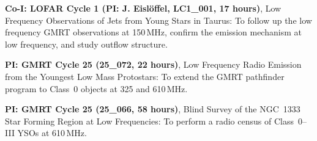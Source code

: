 \begin{cvpubs}
{\begin{cvlist}
  \item {\textbf{Co-I: LOFAR Cycle 1 (PI: J. Eisl{\"o}ffel, LC1\_001, 17 hours)}, Low Frequency Observations of Jets from Young Stars in Taurus: To follow up the low frequency GMRT observations at 150\,MHz, confirm the emission mechanism at low frequency, and study outflow structure.}
  \item {\textbf{PI: GMRT Cycle 25 (25\_072, 22 hours)}, Low Frequency Radio Emission from the Youngest Low Mass Protostars: To extend the GMRT pathfinder program to Class~0 objects at 325 and 610\,MHz.}
  \item {\textbf{PI: GMRT Cycle 25 (25\_066, 58 hours)}, Blind Survey of the NGC~1333 Star Forming Region at Low Frequencies: To perform a radio census of Class~0--III YSOs at 610\,MHz.}
      \end{cvlist}
    }
\end{cvpubs}